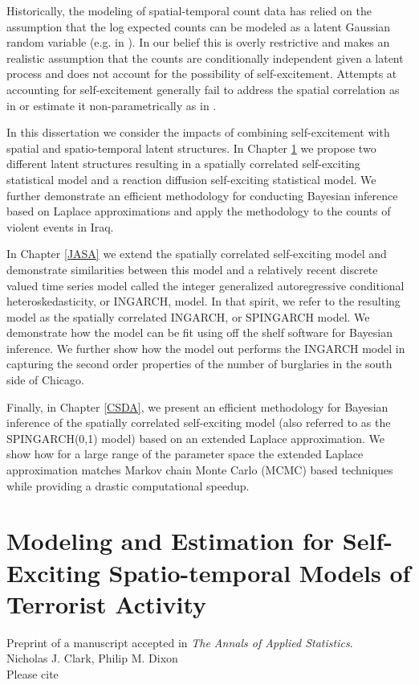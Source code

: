 \documentclass[11pt]{isuthesis}
\begin{document}
Historically, the modeling of spatial-temporal count data has relied on the assumption that the log expected counts can be modeled as a latent Gaussian random variable (e.g. in \cite{python2016bayesian}).  In our belief this is overly restrictive and makes an realistic assumption that the counts are conditionally independent given a latent process and does not account for the possibility of self-excitement.  Attempts at accounting for self-excitement generally fail to address the spatial correlation as in \cite{mohler2013modeling} or estimate it non-parametrically as in \cite{mohler2011self}.  

In this dissertation we consider the impacts of combining self-excitement with spatial and spatio-temporal latent structures.  In Chapter \ref{AoAS} we propose two different latent structures resulting in a spatially correlated self-exciting statistical model and a reaction diffusion self-exciting statistical model.  We further demonstrate an efficient methodology for conducting Bayesian inference based on Laplace approximations and apply the methodology to the counts of violent events in Iraq.

In Chapter \ref{JASA} we extend the spatially correlated self-exciting model and demonstrate similarities between this model and a relatively recent discrete valued time series model called the integer generalized autoregressive conditional heteroskedasticity, or INGARCH, model.  In that spirit, we refer to the resulting model as the spatially correlated INGARCH, or SPINGARCH model.  We demonstrate how the model can be fit using off the shelf software for Bayesian inference.  We further show how the model out performs the INGARCH model in capturing the second order properties of the number of burglaries in the south side of Chicago.

Finally, in Chapter \ref{CSDA}, we present an efficient methodology for Bayesian inference of the spatially correlated self-exciting model (also referred to as the SPINGARCH(0,1) model) based on an extended Laplace approximation.  We show how for a large range of the parameter space the extended Laplace approximation matches Markov chain Monte Carlo (MCMC) based techniques while providing a drastic computational speedup.



\chapter{Modeling and Estimation for Self-Exciting Spatio-temporal Models of Terrorist Activity}\label{AoAS}
\begin{center}
	Preprint of a manuscript accepted in \textit{The Annals of Applied Statistics}.\\
	Nicholas J. Clark, Philip M. Dixon\\
	Please cite \cite{2017arXiv170308429C}
\end{center}
\end{document}
